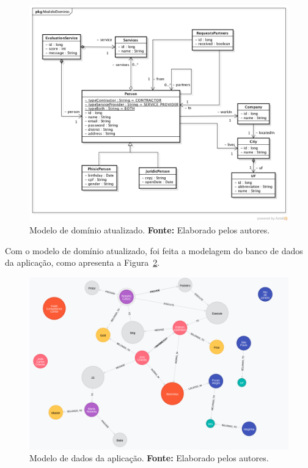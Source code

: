 \begin{figure}[h!]
	\centerline{\includegraphics[scale=0.5]{./imagens/modelo-dominio-com-atributos.png}}
	\caption[Modelo de domínio atualizado]
	{Modelo de domínio atualizado. \textbf{Fonte:} Elaborado pelos autores.}
	\label{fig:modelo_dominio_atualizado}
\end{figure}

Com o modelo de domínio atualizado, foi feita a modelagem do banco de dados da aplicação, como apresenta a Figura~\ref{fig:modelo_dados_aplicacao}.

\begin{figure}[h!]
	\centerline{\includegraphics[scale=0.4]{./imagens/structure-all-nodes.png}}
	\caption[Modelo de dados da aplicação]
	{Modelo de dados da aplicação. \textbf{Fonte:} Elaborado pelos autores.}
	\label{fig:modelo_dados_aplicacao}
\end{figure} 


